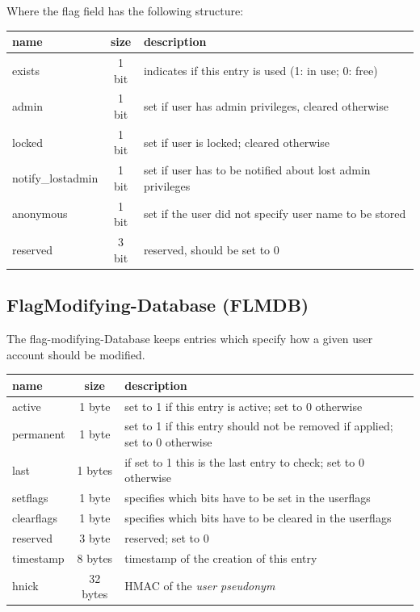 Where the flag field has the following structure: \\
\begin{tabular}{|l|c|l|} \hline
name & size & description \\ \hline 
exists            & 1 bit    &  indicates if this entry is used (1: in use; 0: free)\\
admin             & 1 bit & set if user has admin privileges, cleared otherwise \\
locked            & 1 bit & set if user is locked; cleared otherwise \\
notify\_lostadmin & 1 bit & set if user has to be notified about lost admin privileges \\
anonymous         & 1 bit & set if the user did not specify user name to be stored \\
reserved          & 3 bit & reserved, should be set to 0\\ \hline
\end{tabular} 

\subsection{FlagModifying-Database (FLMDB)}
The flag-modifying-Database keeps entries which specify how a given user account should be modified. \\
\begin{tabular}{|l|c|p{8cm}|} \hline
name & size & description \\ \hline 
active     & 1 byte    & set to 1 if this entry is active; set to 0 otherwise \\
permanent  & 1 byte & set to 1 if this entry should not be removed if applied; set to 0 otherwise \\
last       & 1 bytes & if set to 1 this is the last entry to check; set to 0 otherwise \\ 
setflags   & 1 byte & specifies which bits have to be set in the userflags\\
clearflags & 1 byte & specifies which bits have to be cleared in the userflags\\
reserved   & 3 byte & reserved; set to 0\\
timestamp  & 8 bytes & timestamp of the creation of this entry\\
hnick      & 32 bytes & HMAC of the \textit{user pseudonym}\\
\hline
\end{tabular}

